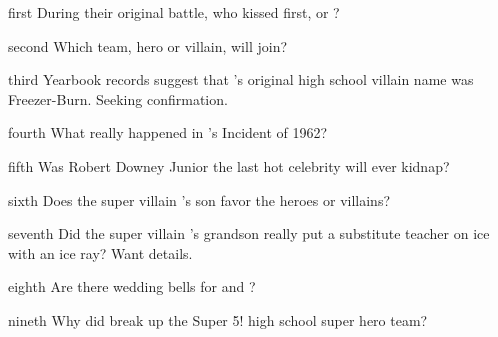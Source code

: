 \documentclass[notebook]{LRSguildcamp1} %
\begin{document}
\startnotebook{\nTest{}}

\begin{page}{first}
During their original battle, who kissed first, \OS{\MYsupername} or \Oldest{\MYsupername}?
\end{page}

\begin{page}{second}
Which team, hero or villain, will \cGrad{} join?
\end{page}

\begin{page}{third}
Yearbook records suggest that \cOldest{\MYsupername}'s original high school villain name was Freezer-Burn. Seeking confirmation. 
\end{page}

\begin{page}{fourth}
What really happened in \cGrandma{\MYsupername}'s Incident of 1962?
\end{page}

\begin{page}{fifth}
Was Robert Downey Junior the last hot celebrity  \cGrandma{\MYsupername} will ever kidnap?
\end{page}


\begin{page}{sixth}
Does the super villain \cGrandma{\MYsupername}'s son \cArchitect{} favor the heroes or villains?
\end{page}


\begin{page}{seventh}
Did the super villain \cGrandma{\MYsupername}'s grandson \cTeen{} really put a substitute teacher on ice with an ice ray? Want details. 
\end{page}

\begin{page}{eighth}
Are there wedding bells for \cYoungest{\MYsupername} and \cYS{\MYsupername} ?
\end{page}

\begin{page}{nineth}
Why did \cYoungest{\MYsupername} break up the Super 5! high school super hero team?
\end{page}

\endnotebook
\end{document}
